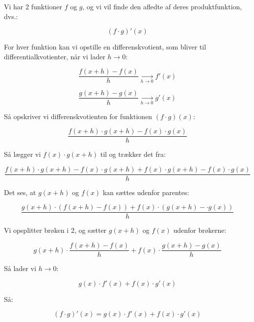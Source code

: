 \begin{proofw}
    

Vi har 2 funktioner $f$ og $g$, og vi vil finde den afledte af deres produktfunktion, dvs.:

$$
    (f\cdot g)'(x)
$$

For hver funktion kan vi opstille en differenskvotient, som bliver til differentialkvotienter, når vi lader $h \rightarrow 0$:

$$
    \frac{f(x+h)-f(x)}{h} \xrightarrow[h \rightarrow 0]{} f'(x)
$$

$$
    \frac{g(x+h)-g(x)}{h} \xrightarrow[h \rightarrow 0]{} g'(x)
$$

Så opskriver vi differenskvotienten for funktionen $(f \cdot g)(x)$:

$$
    \frac{
        f(x+h)\cdot g(x+h)
        -
        f(x) \cdot g(x)
    }{h}
$$

Så lægger vi $f(x) \cdot g(x+h)$ til og trækker det fra:

$$
    \frac{
        f(x+h)\cdot g(x+h)
        -
        f(x) \cdot g(x+h)
        +
        f(x) \cdot g(x+h)
        -
        f(x) \cdot g(x)
    }{h}
$$

Det ses, at $g(x+h)$ og $f(x)$ kan sættes udenfor parentes:

$$
    \frac{
        g(x+h) \cdot (f(x+h)
        -
        f(x))
        +
        f(x) \cdot (g(x+h)
        -
     \cdot g(x))
    }{h}
$$

Vi opsplitter brøken i 2, og sætter $g(x+h)$ og $f(x)$ udenfor brøkerne:

$$
    g(x+h) \cdot \frac{
          f(x+h)
        -
        f(x)   
    }{h}
    +
        f(x) \cdot 
        \frac{g(x+h)
        -
      g(x)}{h}
$$

Så lader vi $h \rightarrow 0$:

$$
    g(x) \cdot f'(x)+f(x) \cdot g'(x)
$$

Så:

$$
    (f \cdot g)'(x)=    g(x) \cdot f'(x)+f(x) \cdot g'(x)
$$

\end{proofw}
